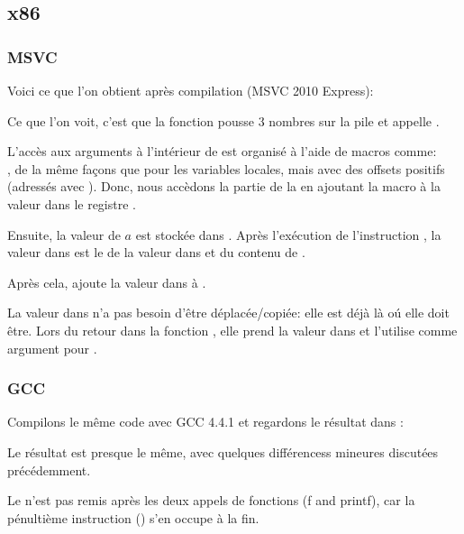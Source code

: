 \subsection{x86}

\subsubsection{MSVC}

Voici ce que l'on obtient après compilation (MSVC 2010 Express):




Ce que l'on voit, c'est que la fonction \main pousse 3 nombres sur la pile et appelle
.

L'accès aux arguments à l'intérieur de \ttf est organisé à l'aide de macros
comme:\\
, 
de la même façons que pour les variables locales, mais avec des offsets positifs
(adressés avec ).
Donc, nous accèdons la partie  de la 
en ajoutant la macro  à la valeur dans le registre \EBP.


Ensuite, la valeur de $a$ est stockée dans \EAX. Après l'exécution de l'instruction
\IMUL, la valeur dans \EAX est le  de la valeur dans \EAX
et du contenu de .

Après cela, \ADD ajoute la valeur dans  à \EAX.

La valeur dans  \EAX n'a pas besoin d'être déplacée/copiée: elle est déjà là
oú elle doit être.
Lors du retour dans la fonction , elle prend la valeur dans
\EAX et l'utilise comme argument pour \printf.



\subsubsection{GCC}

Compilons le même code avec GCC 4.4.1 et regardons le résultat dans \IDA:



Le résultat est presque le même, avec quelques différencess mineures discutées
précédemment.

Le  n'est pas remis après les deux appels
de fonctions (f and printf), car la pénultième instruction  ()
s'en occupe à la fin.

